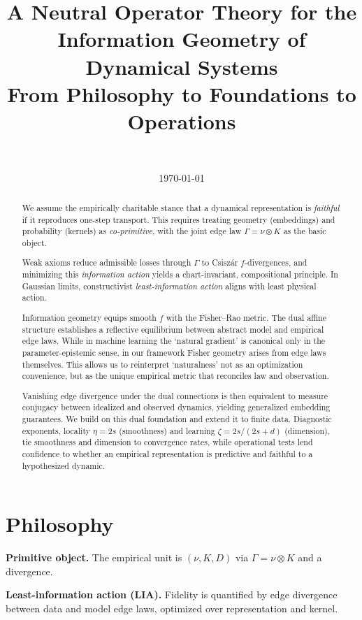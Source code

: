 \documentclass[11pt]{article}
\title{A Neutral Operator Theory for the Information Geometry of Dynamical Systems\\[2pt]
\large From Philosophy to Foundations to Operations}
\author{~}
\date{\today}
\newcommand{\1}{\mathbf{1}}
\begin{document}
\maketitle

\begin{abstract}
We assume the empirically charitable stance that a dynamical representation is \emph{faithful} if it reproduces one-step transport. This requires treating geometry (embeddings) and probability (kernels) as \emph{co-primitive}, with the joint edge law $\Gamma = \nu \otimes K$ as the basic object.  

Weak axioms reduce admissible losses through $\Gamma$ to Csiszár $f$-divergences, and minimizing this \emph{information action} yields a chart-invariant, compositional principle. In Gaussian limits, constructivist \emph{least-information action} aligns with least physical action.  

Information geometry equips smooth $f$ with the Fisher--Rao metric. The dual affine structure establishes a reflective equilibrium between abstract model and empirical edge laws. While in machine learning the ‘natural gradient’ is canonical only in the parameter-epistemic sense, in our framework Fisher geometry arises from edge laws themselves. This allows us to reinterpret ‘naturalness’ not as an optimization convenience, but as the unique empirical metric that reconciles law and observation. 

Vanishing edge divergence under the dual connections is then equivalent to measure conjugacy between idealized and observed dynamics, yielding generalized embedding guarantees.  We build on this dual foundation and extend it to finite data. Diagnostic exponents, locality $\eta=2s$ (smoothness) and learning $\zeta=2s/(2s+d)$ (dimension), tie smoothness and dimension to convergence rates, while operational tests lend confidence to whether an empirical representation is predictive and faithful to a hypothesized dynamic.
\end{abstract}

\section{Philosophy}
\noindent\textbf{Primitive object.} The empirical unit is $(\nu,K,D)$ via $\Gamma=\nu\otimes K$ and a divergence.

\medskip
\noindent\textbf{Least-information action (LIA).} Fidelity is quantified by edge divergence between data and model edge laws, optimized over representation and kernel.
\end{document}

